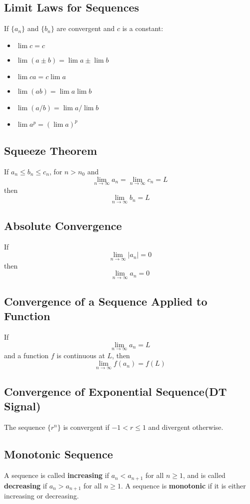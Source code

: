 \documentclass[10pt,a4paper,oneside]{article}
\begin{document}
\subsection{Limit Laws for Sequences}
If $\{a_n\}$ and $\{b_n\}$ are convergent and $c$ is a constant:
\begin{itemize}
	\item $\lim c = c$
	\item $\lim (a \pm b) = \lim a \pm \lim b$
	\item $\lim ca = c \lim a$
	\item $\lim (ab) = \lim a \lim b$
	\item $\lim (a/b) = \lim a / \lim b$
	\item $\lim a^p = (\lim a)^p$
\end{itemize}

\subsection{Squeeze Theorem}
If $a_n \leq b_n \leq c_n$, for $n>n_0$ and
\[
\lim_{n \rightarrow \infty} a_n = \lim_{n \rightarrow \infty} c_n = L 
\]
then
\[
\lim_{n \rightarrow \infty} b_n = L
\]

\subsection{Absolute Convergence}
If
\[
\lim_{n \rightarrow \infty} |a_n| = 0
\]
then
\[
\lim_{n \rightarrow \infty} a_n = 0
\]

\subsection{Convergence of a Sequence Applied to Function}
If
\[
\lim_{n \rightarrow \infty} a_n = L
\]
and a function $f$ is continuous at $L$, then
\[
\lim_{n \rightarrow \infty} f(a_n) = f(L)
\]

\subsection{Convergence of Exponential Sequence(DT Signal)}
The sequence $\{r^n\}$ is convergent if $-1 < r \leq 1$ and divergent otherwise.

\subsection{Monotonic Sequence}
A sequence is called \textbf{increasing} if $a_n < a_{n+1}$ for all $n \geq 1$, and is called \textbf{decreasing} if $a_n > a_{n+1}$ for all $n \geq 1$. A sequence is \textbf{monotonic} if it is either increasing or decreasing.
\end{document}
